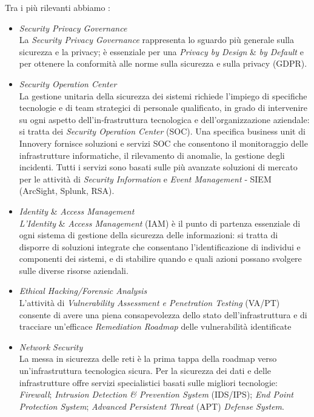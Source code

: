 Tra i più rilevanti abbiamo : \begin{itemize}
    \item \textit{Security Privacy Governance} \\ 
La \textit{Security Privacy Governance} rappresenta lo sguardo più generale sulla sicurezza e la
privacy; è essenziale per una \textit{Privacy by Design} \& \textit{by Default} e per ottenere la conformità
alle norme sulla sicurezza e sulla privacy (GDPR).

    \item \textit{Security Operation Center} \\
    La gestione unitaria della sicurezza dei sistemi richiede l’impiego di specifiche tecnologie e di team strategici di personale qualificato, in grado di intervenire su ogni aspetto dell’in‑frastruttura tecnologica e dell’organizzazione aziendale: si tratta dei \textit{Security Operation Center} (SOC). Una specifica business unit di Innovery fornisce soluzioni e servizi SOC che consentono il monitoraggio delle infrastrutture informatiche, il rilevamento di anomalie, la gestione degli incidenti. Tutti i servizi sono basati sulle più avanzate soluzioni di mercato per le attività di \textit{Security Information} e \textit{Event Management} ‑ SIEM (ArcSight, Splunk, RSA).
    
    \item \textit{Identity} \& \textit{Access Management} \\ 
\textit{L’Identity} \& \textit{Access Management} (IAM) è il punto di partenza essenziale di ogni sistema
di gestione della sicurezza delle informazioni: si tratta di disporre di soluzioni integrate
che consentano l’identificazione di individui e componenti dei sistemi, e di stabilire
quando e quali azioni possano svolgere sulle diverse risorse aziendali.

    \item \textit{Ethical Hacking/Forensic Analysis} \\
L’attività di \textit{Vulnerability Assessment e Penetration Testing} (VA/PT) consente di
avere una piena consapevolezza dello stato dell’infrastruttura e di tracciare un’efficace
\textit{Remediation Roadmap} delle vulnerabilità identificate

    \item \textit{Network Security} \\
La messa in sicurezza delle reti è la prima tappa della roadmap verso un’infrastruttura tecnologica sicura. Per la sicurezza dei dati e delle infrastrutture offre servizi specialistici basati sulle migliori tecnologie: \textit{Firewall}; \textit{Intrusion Detection \& Prevention System} (IDS/IPS); \textit{End Point Protection System}; \textit{Advanced Persistent Threat} (APT) \textit{Defense System}.


\end{itemize}
